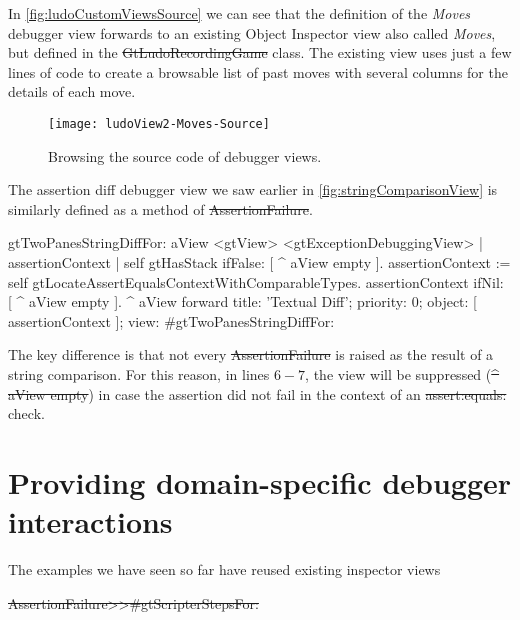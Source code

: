 \documentclass[sigplan,anonymous,review,10pt]{acmart}
\begin{document}
In \autoref{fig:ludoCustomViewsSource} we can see that the definition of the \emph{Moves} debugger view forwards to an existing Object Inspector view also called \emph{Moves}, but defined in the \st{GtLudoRecordingGame} class.
The existing view uses just a few lines of code to create a browsable list of past moves with several columns for the details of each move.

\begin{figure}[h]
  \texttt{[image: ludoView2-Moves-Source]}
  \caption{Browsing the source code of debugger views.}
  \label{fig:ludoCustomViewsSource}
\end{figure}

The assertion diff debugger view we saw earlier in \autoref{fig:stringComparisonView} is similarly defined as a method of \st{AssertionFailure}.
\begin{code}
gtTwoPanesStringDiffFor: aView
	<gtView>
	<gtExceptionDebuggingView>
	| assertionContext |
	self gtHasStack ifFalse: [ ^ aView empty ].
	assertionContext := self gtLocateAssertEqualsContextWithComparableTypes.
	assertionContext ifNil: [ ^ aView empty ].
	^ aView forward
		title: 'Textual Diff';
		priority: 0;
		object: [ assertionContext ];
		view: #gtTwoPanesStringDiffFor:
\end{code}
The key difference is that not every \st{AssertionFailure} is raised as the result of a string comparison.
For this reason, in lines $6-7$, the view will be suppressed (\st{^ aView empty}) in case the assertion did not fail in the context of an \st{assert:equals:} check.

\section{Providing domain-specific debugger interactions}\label{sec:interactions}

The examples we have seen so far have reused existing inspector views


\st{AssertionFailure>>#gtScripterStepsFor:}
\end{document}
